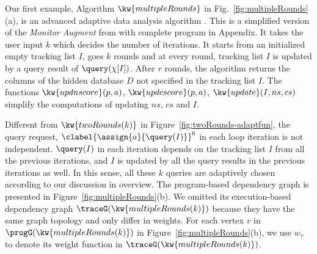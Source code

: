 \begin{example}
\label{ex:multipleRounds}
%
Our first example, Algorithm $\kw{multipleRounds}$ in Fig.~\ref{fig:multipleRounds}(a), is an advanced adaptive data analysis algorithm .
This is a simplified version of the \emph{Monitor Augment} from \cite{RogersRSSTW20} with complete program in Appendix.
It takes the user input $k$ which decides the 
number of iterations.
It starts from an initialized empty tracking list $I$,
goes $k$ rounds and at every round, tracking list $I$ is updated by a query result of $\query(\chi[I])$.
After $r$ rounds, the algorithm returns the columns of the hidden database $D$ not specified in the tracking list $I$.
The functions $\kw{updnscore}(p,a)$,
$\kw{updcscore}(p,a)$, $\kw{update}(I,ns,cs)$ simplify the computations of updating $ns$, $cs$ and $I$.%

    Different from $\kw{twoRounds(k)}$ in Figure~\ref{fig:twoRounds-adaptfun},
the query request, $\clabel{\assign{a}{\query(I)}}^6$ in each loop iteration is not independent. 
$\query(I)$ in each iteration depends on the tracking list $I$ from all the previous iterations, 
and $I$ is updated by all the query results in the previous iterations as well. 
In this sense, all these $k$ queries are adaptively chosen according to our discussion in overview.
The program-based dependency graph is presented in Figure~\ref{fig:multipleRounds}(b). 
We omitted its execution-based dependency graph $\traceG(\kw{multipleRounds(k)})$ because they have the same graph topology and only differ in weights.
For each vertex $v$ in $\progG(\kw{multipleRounds(k)})$ in Figure~\ref{fig:multipleRounds}(b),
we use $w_{v}$ to denote its weight function in $\traceG(\kw{multipleRounds(k)})$.


\end{example}
